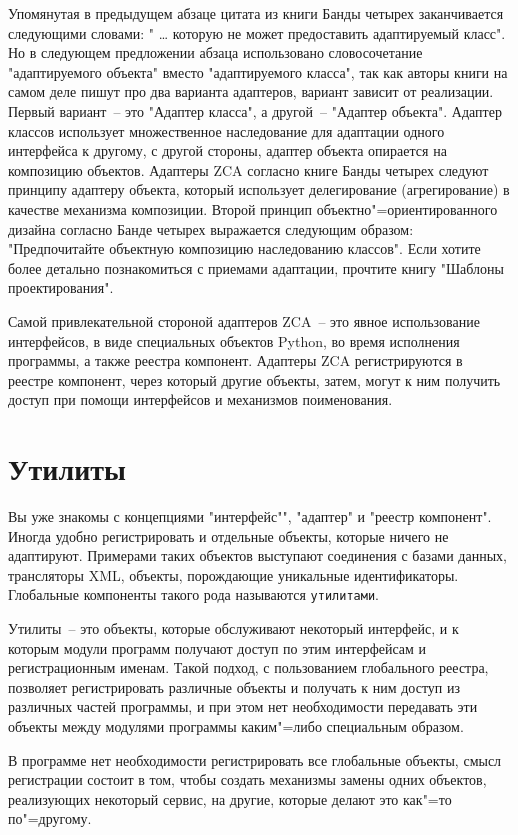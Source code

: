 \documentclass[a4paper,openany,twoside,final]{book}
\begin{document}
Упомянутая в предыдущем абзаце цитата из книги Банды четырех заканчивается следующими словами: " \ldots{} которую не может предоставить адаптируемый класс".  Но в следующем предложении абзаца использовано словосочетание "адаптируемого объекта" вместо "адаптируемого класса", так как авторы книги на самом деле пишут про два варианта адаптеров, вариант зависит от реализации.  Первый вариант~-- это "Адаптер класса", а другой~-- "Адаптер объекта".  Адаптер классов использует множественное наследование для адаптации одного интерфейса к другому, с другой стороны, адаптер объекта опирается на композицию объектов.  Адаптеры ZCA согласно книге Банды четырех следуют принципу адаптеру объекта, который использует делегирование (агрегирование) в качестве механизма композиции.  Второй принцип объектно"=ориентированного дизайна согласно Банде четырех выражается следующим образом: "Предпочитайте объектную композицию наследованию классов".  Если хотите более детально познакомиться с приемами адаптации, прочтите книгу "Шаблоны проектирования".

Самой привлекательной стороной адаптеров ZCA~-- это явное использование интерфейсов, в виде специальных объектов Python, во время исполнения программы, а также реестра компонент.  Адаптеры ZCA регистрируются в реестре компонент, через который другие объекты, затем, могут к ним получить доступ при помощи интерфейсов и механизмов поименования.


\chapter{Утилиты%
  \label{id39}%
}


Вы уже знакомы с концепциями "интерфейс"", "адаптер" и "реестр компонент".  Иногда удобно регистрировать и отдельные объекты, которые ничего не адаптируют.  Примерами таких объектов выступают соединения с базами данных, трансляторы XML, объекты, порождающие уникальные идентификаторы.  Глобальные компоненты такого рода называются \texttt{утилитами}.

Утилиты~-- это объекты, которые обслуживают некоторый интерфейс, и к которым модули программ получают доступ по этим интерфейсам и регистрационным именам.  Такой подход, с пользованием глобального реестра, позволяет регистрировать различные объекты и получать к ним доступ из различных частей программы, и при этом нет необходимости передавать эти объекты между модулями программы каким"=либо специальным образом.

В программе нет необходимости регистрировать все глобальные объекты, смысл регистрации состоит в том, чтобы создать механизмы замены одних объектов, реализующих некоторый сервис, на другие, которые делают это как"=то по"=другому.
\end{document}
